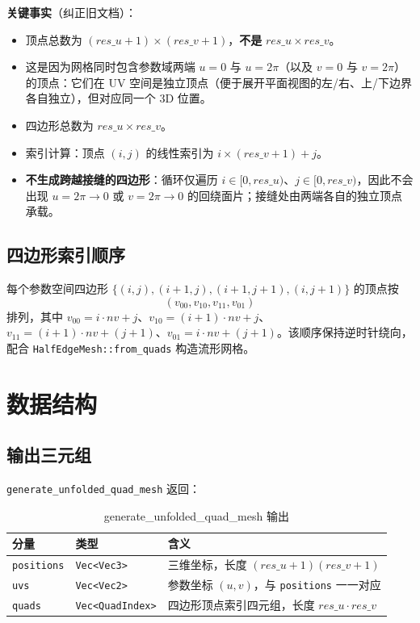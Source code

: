 \documentclass[12pt,a4paper]{article}
\begin{document}
\textbf{关键事实}（纠正旧文档）：
\begin{itemize}
\item 顶点总数为 \textbf{$(res\_u+1) \times (res\_v+1)$}，\textbf{不是} $res\_u \times res\_v$。
\item 这是因为网格同时包含参数域两端 $u=0$ 与 $u=2\pi$（以及 $v=0$ 与 $v=2\pi$）的顶点：它们在 UV 空间是独立顶点（便于展开平面视图的左/右、上/下边界各自独立），但对应同一个 3D 位置。
\item 四边形总数为 $res\_u \times res\_v$。
\item 索引计算：顶点 $(i,j)$ 的线性索引为 $i \times (res\_v+1) + j$。
\item \textbf{不生成跨越接缝的四边形}：循环仅遍历 $i \in [0, res\_u)$、$j \in [0, res\_v)$，因此不会出现 $u=2\pi \to 0$ 或 $v=2\pi \to 0$ 的回绕面片；接缝处由两端各自的独立顶点承载。
\end{itemize}

\subsection{四边形索引顺序}

每个参数空间四边形 $\{(i,j), (i+1,j), (i+1,j+1), (i,j+1)\}$ 的顶点按
\begin{equation}
(v_{00}, v_{10}, v_{11}, v_{01})
\end{equation}
排列，其中 $v_{00}=i\cdot nv+j$、$v_{10}=(i+1)\cdot nv+j$、$v_{11}=(i+1)\cdot nv+(j+1)$、$v_{01}=i\cdot nv+(j+1)$。该顺序保持逆时针绕向，配合 \texttt{HalfEdgeMesh::from\_quads} 构造流形网格。

\section{数据结构}

\subsection{输出三元组}

\texttt{generate\_unfolded\_quad\_mesh} 返回：

\begin{table}[h]
\centering
\begin{tabular}{lll}
\hline
分量 & 类型 & 含义 \\
\hline
\texttt{positions} & \texttt{Vec<Vec3>} & 三维坐标，长度 $(res\_u+1)(res\_v+1)$ \\
\texttt{uvs}       & \texttt{Vec<Vec2>} & 参数坐标 $(u,v)$，与 \texttt{positions} 一一对应 \\
\texttt{quads}     & \texttt{Vec<QuadIndex>} & 四边形顶点索引四元组，长度 $res\_u\cdot res\_v$ \\
\hline
\end{tabular}
\caption{generate\_unfolded\_quad\_mesh 输出}
\end{table}
\end{document}
